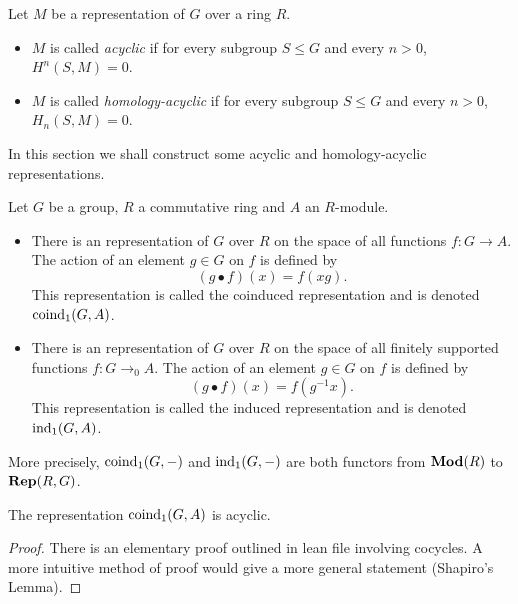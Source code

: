 \begin{definition}\label{def:acyclic}
	\leanok
	Let $M$ be a representation of $G$ over a ring $R$.
	\begin{itemize}
		\item
		$M$ is called \emph{acyclic} if for every subgroup $S \le G$
		and every $n > 0$, $H^n(S,M) = 0$.
		\item
		$M$ is called \emph{homology-acyclic} if for every subgroup $S \le G$
		and every $n > 0$, $H_n(S,M) = 0$.
	\end{itemize}
\end{definition}

In this section we shall construct some acyclic and homology-acyclic representations.

\begin{definition}\label{def:induced}
	\leanok
	Let $G$ be a group, $R$ a commutative ring and $A$ an $R$-module.
	\begin{itemize}
		\item
		There is an representation of $G$ over $R$
		on the space of all functions $f : G \to A$. The action of an element $g \in G$ on $f$
		is defined by
		\[
			(g \bullet f) (x) = f(xg).
		\]
		This representation is called the coinduced representation and is denoted $\mathrm{coind}_1(G,A)$.
		\item
		There is an representation of $G$ over $R$
		on the space of all finitely supported functions $f : G \to_0 A$.
		The action of an element $g \in G$ on $f$ is defined by
		\[
			(g \bullet f) (x) = f(g^{-1}x).
		\]
		This representation is called the induced representation and is denoted $\mathrm{ind}_1(G,A)$.
	\end{itemize}
	More precisely, $\mathrm{coind}_1(G,-)$ and $\mathrm{ind}_1(G,-)$ are both functors from $\mathbf{Mod}(R)$ to $\mathbf{Rep}(R,G)$.
\end{definition}

\begin{lemma}	\label{lem:coind₁ acyclic}
	\leanok
	The representation $\mathrm{coind}_1(G,A)$ is acyclic.
\end{lemma}

\begin{proof}
	There is an elementary proof outlined in lean file involving cocycles.
	A more intuitive method of proof would give a more general statement (Shapiro's Lemma).
\end{proof}

